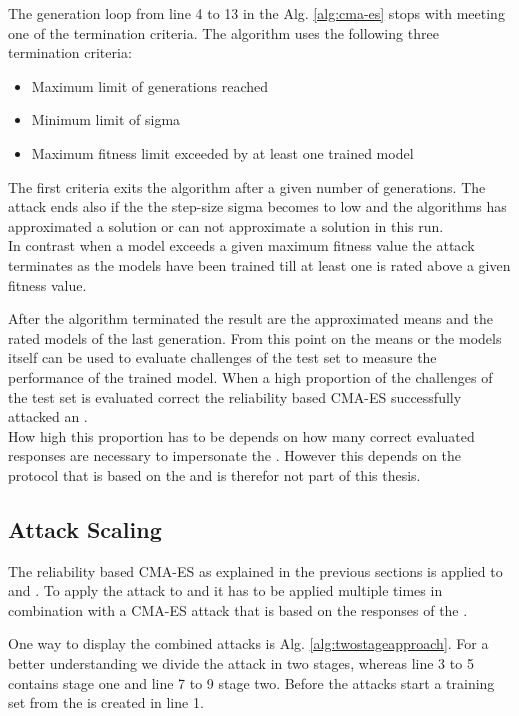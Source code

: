 The generation loop from line 4 to 13 in the Alg. \ref{alg:cma-es} stops with meeting one of the termination criteria.
The algorithm uses the following three termination criteria:

\begin{itemize}
\item Maximum limit of generations reached
\item Minimum limit of sigma
\item Maximum fitness limit exceeded by at least one trained model
\end{itemize}

The first criteria exits the algorithm after a given number of generations.
The attack ends also if the the step-size sigma becomes to low and the algorithms has approximated a solution or can not approximate a solution in this run.\\
In contrast when a model exceeds a given maximum fitness value the attack terminates as the models have been trained till at least one is rated above a given fitness value.

After the algorithm terminated the result are the approximated means and the rated models of the last generation.
From this point on the means or the models itself can be used to evaluate challenges of the test set to measure the performance of the trained model. 
When a high proportion of the challenges of the test set is evaluated correct the reliability based \ac{CMA-ES} successfully attacked an \apuf.\\
How high this proportion has to be depends on how many correct evaluated responses are necessary to impersonate the \puf.
However this depends on the protocol that is based on the \puf and is therefor not part of this thesis.


\subsection{Attack Scaling}
\label{sec:attackscaling}

The reliability based \ac{CMA-ES} as explained in the previous sections is applied to \apufs and \mpuf.
To apply the attack to \xpufs and \mxpuf it has to be applied multiple times in combination with a \ac{CMA-ES} attack that is based on the responses of the \puf.

One way to display the combined attacks is Alg. \ref{alg:twostageapproach}.
For a better understanding we divide the attack in two stages, whereas line 3 to 5 contains stage one and line 7 to 9 stage two.
Before the attacks start a training set from the \xpuf is created in line 1.

